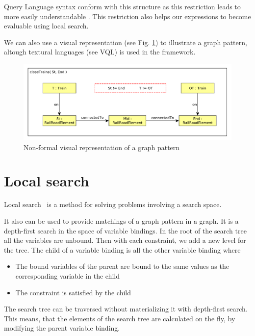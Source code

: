 \viatra{} Query Language syntax conform with this structure as this restriction leads to more easily understandable .
This restriction also helps our expressions to become evaluable using local search.

We can also use a visual representation (see Fig. \ref{fig:pattern-visual}) to illustrate a graph pattern, altough textural languages (see VQL) is used in the framework.

\begin{figure}[h]
	\begin{center}
		\includegraphics[width=\textwidth]{figures/closeTrains-pattern.pdf}
		\caption{Non-formal visual representation of a graph pattern}
		\label{fig:pattern-visual}
	\end{center}
\end{figure}


\section{Local search}


Local search~\cite{bur-marton-msc} is a method for solving problems involving a search space. 

It also can be used to provide matchings of a graph pattern in a graph. 
It is a depth-first search in the space of variable bindings. 
In the root of the search tree all the variables are unbound. 
Then with each constraint, we add a new level for the tree.
The child of a variable binding is all the other variable binding where 
\begin{itemize}
	\item The bound variables of the parent are bound to the same values as the corresponding variable in the child
	\item The constraint is satisfied by the child
\end{itemize}

The search tree can be traversed without materializing it with depth-first search. This means, that the elements of the search tree are calculated on the fly, by modifying the parent variable binding.

